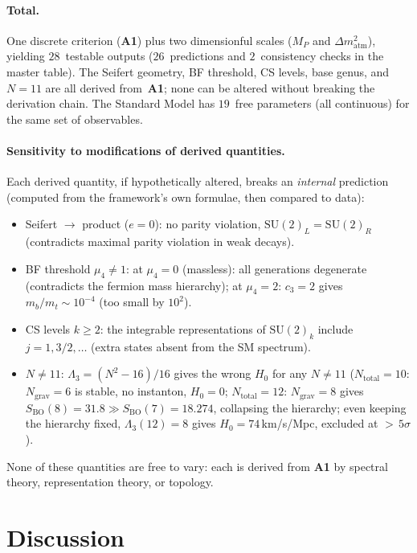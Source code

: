 \paragraph{Total.}
One discrete criterion (\textbf{A1})
plus two dimensionful scales ($M_P$ and
$\Delta m^2_{\mathrm{atm}}$),
yielding $28$~testable outputs ($26$~predictions and
$2$~consistency checks in the master table).
The Seifert geometry, BF threshold, CS levels, base genus,
and $N = 11$ are all derived from~\textbf{A1};
none can be altered without breaking the derivation chain.
The Standard Model has $19$~free parameters
(all continuous) for the same set of observables.

\paragraph{Sensitivity to modifications of derived quantities.}
Each derived quantity, if hypothetically altered, breaks an
\emph{internal} prediction (computed from the
framework's own formulae, then compared to data):
\begin{itemize}
\item Seifert $\to$ product ($e = 0$):
  no parity violation, $\mathrm{SU}(2)_L = \mathrm{SU}(2)_R$
  (contradicts maximal parity violation in weak decays).
\item BF threshold $\mu_4 \ne 1$:
  at $\mu_4 = 0$ (massless): all generations degenerate
  (contradicts the fermion mass hierarchy);
  at $\mu_4 = 2$: $c_3 = 2$ gives $m_b/m_t \sim 10^{-4}$
  (too small by $10^2$).
\item CS levels $k \ge 2$:
  the integrable representations of $\mathrm{SU}(2)_k$
  include $j = 1, 3/2, \ldots$ (extra states absent
  from the SM spectrum).
\item $N \ne 11$:
  $\Lambda_3 = (N^2{-}16)/16$ gives the wrong $H_0$
  for any $N \ne 11$
  ($N_{\mathrm{total}} = 10$: $N_{\mathrm{grav}} = 6$ is stable,
  no instanton, $H_0 = 0$;
  $N_{\mathrm{total}} = 12$: $N_{\mathrm{grav}} = 8$ gives
  $S_{\mathrm{BO}}(8) = 31.8 \gg S_{\mathrm{BO}}(7) = 18.274$,
  collapsing the hierarchy;
  even keeping the hierarchy fixed,
  $\Lambda_3(12) = 8$ gives $H_0 = 74$\,km/s/Mpc,
  excluded at ${>}\,5\sigma$).
\end{itemize}
None of these quantities are free to vary:
each is derived from \textbf{A1} by spectral
theory, representation theory, or topology.


\section{Discussion}
\label{sec:discussion}

